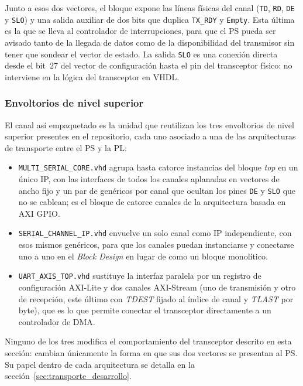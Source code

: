 Junto a esos dos vectores, el bloque expone las líneas físicas del canal (\texttt{TD},
\texttt{RD}, \texttt{DE} y \texttt{SLO}) y una salida auxiliar de dos bits que duplica
\texttt{TX\_RDY} y \texttt{Empty}. Esta última es la que se lleva al controlador de interrupciones,
para que el PS pueda ser avisado tanto de la llegada de datos como de la disponibilidad del
transmisor sin tener que sondear el vector de estado. La salida \texttt{SLO} es una conexión
directa desde el bit~27 del vector de configuración hasta el pin del transceptor físico: no
interviene en la lógica del transceptor en VHDL.

\subsubsection{Envoltorios de nivel superior}

El canal así empaquetado es la unidad que reutilizan los tres envoltorios de nivel superior
presentes en el repositorio, cada uno asociado a una de las arquitecturas de transporte entre el
PS y la PL:

\begin{itemize}
    \item \texttt{MULTI\_SERIAL\_CORE.vhd} agrupa hasta catorce instancias del bloque \textit{top}
    en un único IP, con las interfaces de todos los canales aplanadas en vectores de ancho fijo y
    un par de genéricos por canal que ocultan los pines \texttt{DE} y \texttt{SLO} que no se
    cablean; es el bloque de catorce canales de la arquitectura basada en AXI GPIO.

    \item \texttt{SERIAL\_CHANNEL\_IP.vhd} envuelve un solo canal como IP independiente, con esos
    mismos genéricos, para que los canales puedan instanciarse y conectarse uno a uno en el
    \textit{Block Design} en lugar de como un bloque monolítico.

    \item \texttt{UART\_AXIS\_TOP.vhd} sustituye la interfaz paralela por un registro de
    configuración AXI-Lite y dos canales AXI-Stream (uno de transmisión y otro de recepción, este
    último con \textit{TDEST} fijado al índice de canal y \textit{TLAST} por byte), que es lo que
    permite conectar el transceptor directamente a un controlador de DMA.
\end{itemize}

Ninguno de los tres modifica el comportamiento del transceptor descrito en esta sección: cambian
únicamente la forma en que sus dos vectores se presentan al PS. Su papel dentro de cada
arquitectura se detalla en la sección~\ref{sec:transporte_desarrollo}.

